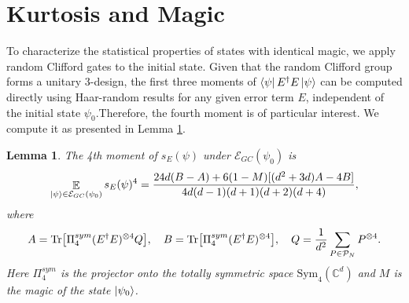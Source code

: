 \documentclass[showpacs,amsmath,amssymb,twocolumn,aps,pra,superscriptaddress,notitlepage,10pt]{revtex4-2}
\newcommand{\bE}{\mathbb E}
\newcommand{\cM}{\mathcal E_{GC}}
\newtheorem{lemma}{Lemma}
\begin{document}
\section{Kurtosis and Magic}
To characterize the statistical properties of states with identical magic, we apply random Clifford gates to the initial state. Given that the random Clifford group forms a unitary 3-design, the first three moments of $\bra{\psi}E^\dagger E\ket{\psi}$ can be computed directly using Haar-random results for any given error term $E$, independent of the initial state $\psi_0$.Therefore, the fourth moment is of particular interest. We compute it as presented in Lemma \ref{lem:4moment}.
\begin{lemma}\label{lem:4moment}
    The 4th moment of $s_E(\psi)$ under $\cM(\psi_0)$ is
    \begin{equation}
        \mathop{\bE}_{\ket{\psi}\in\cM(\psi_0)} s_E(\psi)^4= \frac{24d(B-A)+6(1-M)[(d^2+3d)A-4B]}{4d(d-1)(d+1)(d+2)(d+4)},\label{equ:4moment}
    \end{equation}
    where
    \begin{equation}
        \begin{aligned}
            A = \Tr[\Pi_4^{sym}(E^{\dagger} E)^{\otimes 4} Q],\quad
            B = \Tr[\Pi_4^{sym}(E^{\dagger} E)^{\otimes 4}],\quad
            Q = \frac{1}{d^2}\sum_{P\in\mathcal P_N}P^{\otimes 4}.
        \end{aligned}\label{equ: ABQ}
    \end{equation}
    Here $\Pi_4^{sym}$ is the projector onto the totally symmetric space $\mathrm{Sym}_4(\mathbb C^d)$ and $M$ is the magic of the state $\ket{\psi_0}$.
\end{lemma}
\end{document}

